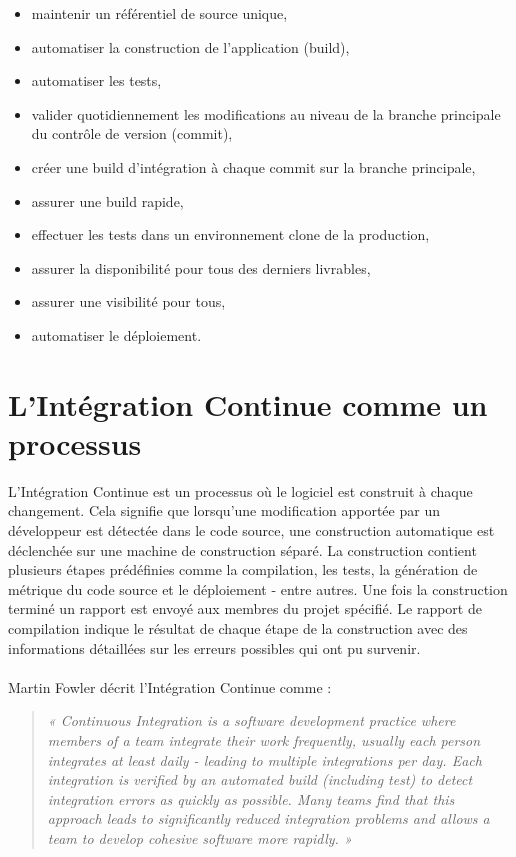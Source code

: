 \documentclass{report}
\begin{document}
    \begin{itemize}
      \item maintenir un référentiel de source unique,
      \item automatiser la construction de l’application (build),
      \item automatiser les tests,
      \item valider quotidiennement les modifications au niveau de la branche principale du contrôle de version (commit),
      \item créer une build d’intégration à chaque commit sur la branche principale,
      \item assurer une build rapide,
      \item effectuer les tests dans un environnement clone de la production,
      \item assurer la disponibilité pour tous des derniers livrables,
      \item assurer une visibilité pour tous,
      \item automatiser le déploiement.\\
    \end{itemize}

    \section{L'Intégration Continue comme un processus}
    L’Intégration Continue est un processus où le logiciel est construit à chaque changement. Cela signifie que lorsqu’une modification apportée par un développeur est détectée dans le code source, une construction automatique est déclenchée sur une machine de construction séparé. La construction contient plusieurs étapes prédéfinies comme la compilation, les tests, la génération de métrique du code source et le déploiement - entre autres. Une fois la construction terminé un rapport est envoyé aux membres du projet spécifié. Le rapport de compilation indique le résultat de chaque étape de la construction avec des informations détaillées sur les erreurs possibles qui ont pu survenir.\\\\

    Martin Fowler \cite{Fow00} décrit l’Intégration Continue comme :\\
    \begin{quotation}
      \emph{« Continuous Integration is a software development practice where members of a team integrate their work frequently, usually each person integrates at least daily - leading to multiple integrations per day. Each integration is verified by an automated build (including test) to detect integration errors as quickly as possible. Many teams find that this approach leads to significantly reduced integration problems and allows a team to develop cohesive software more rapidly. »}
    \end{quotation}
\end{document}
